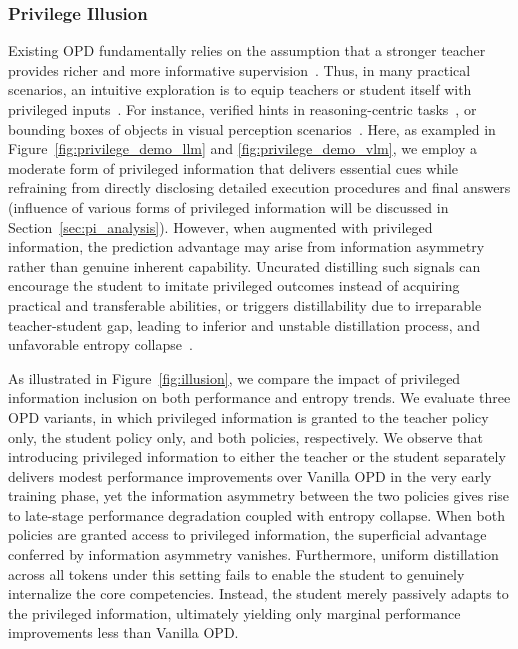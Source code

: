 \documentclass{llmxive}
\begin{document}
\subsubsection{Privilege Illusion}
Existing OPD fundamentally relies on the assumption that a stronger teacher provides richer and more informative supervision~\citep{thinking2025opd,ko2025distillm}. 
Thus, in many practical scenarios, an intuitive exploration is to equip teachers or student itself with privileged inputs~\citep{song2026survey}. 
For instance, verified hints in reasoning-centric tasks~\citep{zhao2026self,penaloza2026privileged,hubotter2026reinforcement}, or bounding boxes of objects in visual perception scenarios~\citep{liu2026visual,yuan2026vision}.
Here, as exampled in Figure~\ref{fig:privilege_demo_llm} and \ref{fig:privilege_demo_vlm}, we employ a moderate form of privileged information that delivers essential cues while refraining from directly disclosing detailed execution procedures and final answers (influence of various forms of privileged information will be discussed in Section~\ref{sec:pi_analysis}).
However, when augmented with privileged information, the prediction advantage may arise from information asymmetry rather than genuine inherent capability. Uncurated distilling such signals can encourage the student to imitate privileged outcomes instead of acquiring practical and transferable abilities, or triggers distillability due to irreparable teacher-student gap, leading to inferior and unstable distillation process, and unfavorable entropy collapse~\citep{cui2025entropy,yu2026dapo}.




As illustrated in Figure~\ref{fig:illusion}, we compare the impact of privileged information inclusion on both performance  and entropy trends. We evaluate three OPD variants, in which privileged information is granted to the teacher policy only, the student policy only, and both policies, respectively. We observe that introducing privileged information to either the teacher or the student separately delivers modest performance improvements over Vanilla OPD in the very early training phase, yet the information asymmetry between the two policies gives rise to late-stage performance degradation coupled with entropy collapse. 
When both policies are granted access to privileged information, the superficial advantage conferred by information asymmetry vanishes. Furthermore, uniform distillation across all tokens under this setting fails to enable the student to genuinely internalize the core competencies. Instead, the student merely passively adapts to  the privileged information, ultimately yielding only marginal performance improvements less than Vanilla OPD.
\end{document}
